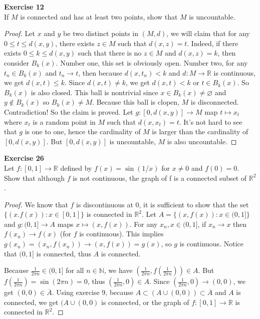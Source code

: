 \documentclass[12pt, a4paper]{article}
\theoremstyle{plain}
\newcommand{\N}{\mathbb{N}}
\newcommand{\R}{\mathbb{R}}
\newenvironment{exercise}[2][Exercise]
    { \begin{mdframed}[backgroundcolor=gray!20] \textbf{#1 #2} \\}
    {  \end{mdframed}}
\begin{document}
\begin{exercise}{12}
If $M$ is connected and has at least two points, show that $M$ is uncountable.
\end{exercise}
	\begin{proof}
	Let $x$ and $y$ be two distinct points in $(M,d)$, we will claim that for any $0\leq t\leq d(x,y)$, there exists $z\in M$ such that $d(x,z)=t$. Indeed, if there exists $0\leq k\leq d(x,y)$ such that there is no $z\in M$ and $d(x,z)=k$, then consider $B_k(x)$. Number one, this set is obviously open. Number two, for any $t_n\in B_k(x)$ and $t_n\rightarrow t$, then because $d(x,t_n)<k$ and $d:M\rightarrow\R$ is continuous, we get $d(x,t)\leq k$. Since $d(x,t)\neq k$, we get $d(x,t)<k$ or $t\in B_k(x)$. So $B_k(x)$ is also closed. This ball is nontrivial since $x\in B_k(x)\neq \varnothing$ and $y\notin B_k(x)$ so $B_k(x)\neq M$. Because this ball is clopen, $M$ is disconnected. Contradiction! So the claim is proved. Let $g:[0,d(x,y)]\rightarrow M$ map $t\mapsto x_t$ where $x_t$ is a random point in $M$ such that $d(x,x_t)=t$. It's not hard to see that $g$ is one to one, hence the cardinality of $M$ is larger than the cardinality of $[0,d(x,y)]$. But $[0,d(x,y)]$ is uncountable, $M$ is also uncountable.
	\end{proof}

\begin{exercise}{26}
Let $f:[0,1]\rightarrow \R$ defined by $f(x)= \sin(1/x)$ for $x\neq 0$ and $f(0)=0$. Show that although $f$ is not continuous, the graph of f is a connected subset of $\R^2$.
\end{exercise}
	\begin{proof}
	We know that $f$ is discontinuous at $0$, it is sufficient to show that the set $\{(x.f(x)):x\in [0,1]\}$ is connected in $\R^2$. Let $A=\{(x,f(x)):x\in (0,1]\}$ and $g:(0,1]\rightarrow A$ maps $x\mapsto (x,f(x))$. For any $x_n,x\in (0,1]$, if $x_n\rightarrow x$ then $f(x_n)\rightarrow f(x)$ (for $f$ is continuous). This implies $g(x_n)=(x_n,f(x_n))\rightarrow (x,f(x))=g(x)$, so $g$ is continuous. Notice that $(0,1]$ is connected, thus $A$ is connected.
	
	Because $\frac{1}{2\pi n}\in (0,1]$ for all $n\in\N$, we have $(\frac{1}{2\pi n}, f(\frac{1}{2\pi n}))\in A$. But $f(\frac{1}{2\pi n})=\sin(2\pi n)=0$, thus $(\frac{1}{2\pi n}, 0)\in A$. Since $(\frac{1}{2\pi n},0)\rightarrow (0,0)$, we get $(0,0)\in \overline{A}$. Using exercise 9, because $A\subset (A\cup (0,0))\subset \overline{A}$ and $A$ is connected, we get $(A\cup (0,0)$ is connected, or the graph of $f:[0,1]\rightarrow \R$ is connected in $\R^2$.
	\end{proof}
\end{document}
